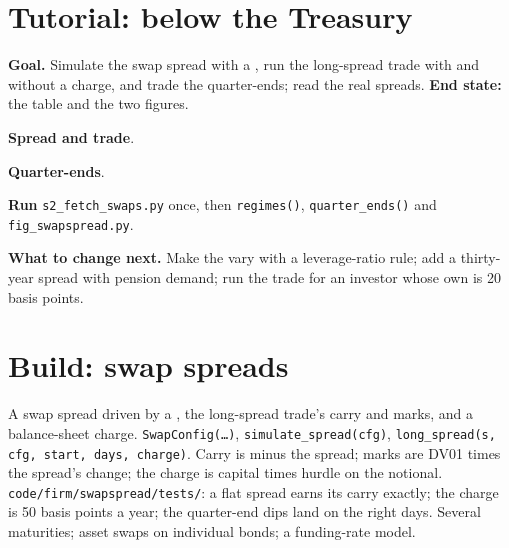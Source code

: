 \section{Tutorial: below the Treasury}\label{tut:s2:swap-spread-and-asset-swap-trades:tut}

\begin{tutorial}
\textbf{Goal.} Simulate the swap spread with a , run the long-spread trade with and without a charge, and trade the quarter-ends;
read the real spreads. \textbf{End state:} the table and the two figures.
\begin{tutsteps}
\item \textbf{Spread and trade}.
\label{lst:s2:swap-spread-and-asset-swap-trades:model}
\item \textbf{Quarter-ends}.
\label{lst:s2:swap-spread-and-asset-swap-trades:qe}
\item \textbf{Run} \texttt{s2\_fetch\_swaps.py} once, then \texttt{regimes()}, \texttt{quarter\_ends()} and \texttt{fig\_swapspread.py}.
\end{tutsteps}
\textbf{What to change next.} Make the  vary with a leverage-ratio rule; add a thirty-year spread with pension demand; run the trade
for an investor whose own  is 20 basis points.
\end{tutorial}

\section{Build: swap spreads}\label{bld:s2:swap-spread-and-asset-swap-trades:swapspread}

\begin{build}
 A swap spread driven by a , the long-spread trade's carry and marks, and a balance-sheet charge.
 \texttt{SwapConfig(\dots)}, \texttt{simulate\_spread(cfg)}, \texttt{long\_spread(s, cfg, start, days, charge)}.
 Carry is minus the spread; marks are DV01 times the spread's change; the charge is capital times hurdle on the notional.
 \texttt{code/firm/swapspread/tests/}: a flat spread earns its carry exactly; the charge is 50 basis points a year; the
quarter-end dips land on the right days.
 Several maturities; asset swaps on individual bonds; a funding-rate model.
\end{build}

